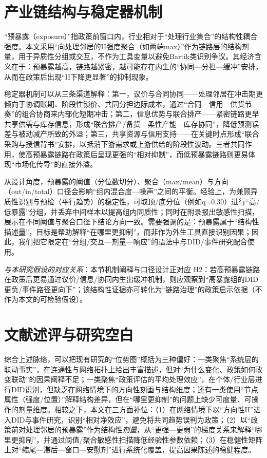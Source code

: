 \section{产业链结构与稳定器机制}
“预暴露（exposure）”指政策前窗口内，行业相对于“处理行业集合”的结构性耦合强度。本文采用“向处理邻居的II强度聚合（如两端max）”作为链路层的结构剂量，用于异质性分组或交互，不作为工具变量以避免Bartik类识别争议\citep{goldsmithpinkham2020bartik}。其经济含义在于：预暴露越高，链路越紧密，越可能存在内生的“协同—分担—缓冲”安排，从而在政策后出现“II下降更显著”的抑制现象。

稳定器机制可以从三条渠道解释：第一，议价与合同协同——处理邻居在冲击期更倾向于协调账期、阶段性锁价、共同分担边际成本，通过“合同—信用—供货节奏”的组合协商来内部化短期冲击；第二，信息优势与联合排产——紧密链路更早共享供需与库存信息，形成“联合排产/备货—柔性产能—库存协同”，降低预测误差与被动减产所致的外溢；第三，共享资源与信用支持——在关键时点形成“联合采购与授信背书”安排，以抵消下游需求或上游供给的阶段性波动。三者共同作用，使高预暴露链路在政策后呈现更强的“相对抑制”，而低预暴露链路则更易体现“市场化传导”的直接外溢。

从设计角度，预暴露的阈值（分位数切分）、聚合（max/mean）与方向（out/in/total）口径会影响“组内混合度—噪声”之间的平衡。经验上，为兼顾异质性识别与预检（平行趋势）的稳定性，可取顶/底分位（例如q=0.30）进行“高/低暴露”分组，并丢弃中间样本以提高组内同质性；同时在附录报出敏感性扫描，展示在不同阈值与聚合口径下结论方向一致。需要强调的是：预暴露属于“结构性描述量”，目标是帮助解释“在哪里更抑制”，而非作为外生工具直接识别因果；因此，我们把它限定在“分组/交互—剂量—响应”的语法中与DID/事件研究配合使用。

\noindent\textit{与本研究假设的对应关系}：本节机制阐释与口径设计正对应 H2：若高预暴露链路在政策后更易通过议价/信息/协同内生出缓冲机制，则应观察到“高暴露组的DID更负/事件路径更向下”；该结构性证据亦可转化为“链路治理”的政策启示依据（不作为本文的可检验假设）。
\section{文献述评与研究空白}
综合上述脉络，可以把现有研究的“位势图”概括为三种偏好：一类聚焦“系统层的联动事实”，在连通性与网络拓扑上给出丰富描述，但对“为什么变化、政策如何改变联动”的因果阐释不足；一类聚焦“政策评估的平均处理效应”，在个体/行业层进行DID识别，但缺乏在网络情境下的方向性刻画与结构维度；还有一类使用“节点属性（强度/位置）”解释结构差异，但在“哪里更抑制”的问题上缺少可度量、可操作的剂量维度。相较之下，本文在三方面补位：（1）在网络情境下以“方向性II”进入DID与事件研究，识别“相对净效应”，避免将共同趋势误判为政策；（2）以“政策前对处理邻居的预暴露”作为结构性\emph{剂量}，从“更强—更弱”的梯度关系来解释“哪里更抑制”，并通过阈值/聚合敏感性扫描降低经验性参数依赖；（3）在稳健性矩阵上对“缩尾—滞后—窗口—安慰剂”进行系统化覆盖，提高因果陈述的稳健程度。

